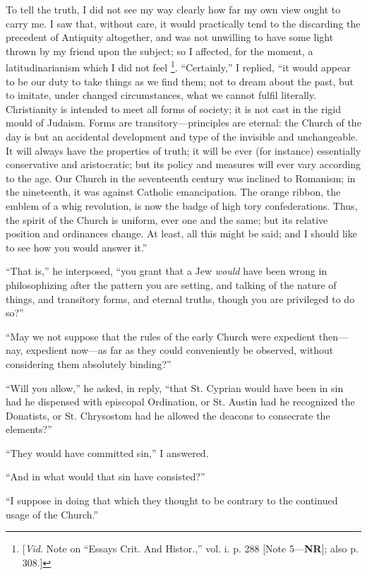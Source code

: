 To tell the truth, I did not see my way clearly
how far my own view ought to carry me. I saw that, without care, it
would practically tend to the discarding the precedent of Antiquity
altogether, and was not unwilling to have some light thrown by my
friend upon the subject; so I affected, for the moment, a
latitudinarianism which I did not feel \footnote{[\emph{Vid}. Note on ``Essays Crit. And
Histor.,'' vol. i. p.
288 [Note 5—\textbf{NR}]; also p.
308.]}. ``Certainly,'' I
replied, ``it would appear to be our duty to take things as we find
them; not to dream about the past, but to imitate, under changed
circumstances, what we cannot fulfil literally. Christianity is
intended to meet all forms of society; it is not cast in the rigid
mould of Judaism. Forms are transitory—principles are eternal: the
Church of the day is but an accidental development and type of
the invisible and unchangeable. It will always have the properties of
truth; it will be ever (for instance) essentially conservative and
aristocratic; but its policy and measures will ever vary according to
the age. Our Church in the seventeenth century was inclined to
Romanism; in the nineteenth, it was against Catholic emancipation. The
orange ribbon, the emblem of a whig revolution, is now the badge of
high tory confederations. Thus, the spirit of the Church is uniform,
ever one and the same; but its relative position and ordinances
change. At least, all this might be said; and I should like to see how
you would answer it.''

``That is,'' he interposed, ``you grant that a Jew \emph{would} have been wrong in philosophizing after the pattern you are
setting, and talking of the nature of things, and transitory forms,
and eternal truths, though you are privileged to do so?''

``May we not suppose that the rules of the early
Church were expedient then—nay, expedient now—as far as they could
conveniently be observed, without considering them absolutely binding?''

``Will you allow,'' he asked, in reply, ``that St.
Cyprian would have been in sin had he dispensed with episcopal
Ordination, or St. Austin had he recognized the Donatists, or St.
Chrysostom had he allowed the deacons to consecrate the elements?''

``They would have committed sin,'' I answered.

``And in what would that sin have consisted?''

``I suppose in doing that which they thought to be
contrary to the continued usage of the Church.''

